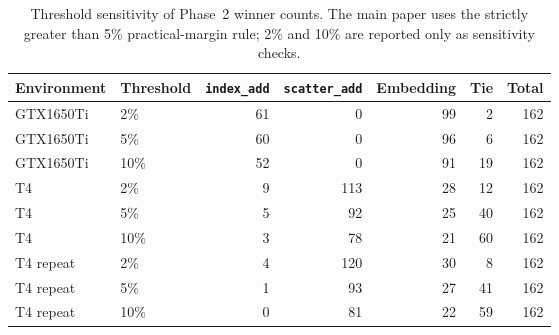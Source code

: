 \begin{table}[t]
\centering\fontsize{9}{11}\selectfont
\caption{Threshold sensitivity of Phase~2 winner counts. The main paper uses the strictly greater than 5\% practical-margin rule; 2\% and 10\% are reported only as sensitivity checks.}
\label{tab:threshold-sensitivity-phase2}
\setlength{\tabcolsep}{3pt}
\renewcommand{\arraystretch}{1.12}
\begin{tabular*}{\textwidth}{@{\extracolsep{\fill}}llrrrrr@{}}
\toprule
Environment & Threshold & \texttt{index\_add} & \texttt{scatter\_add} & Embedding & Tie & Total \\
\midrule
GTX1650Ti & 2\% & 61 & 0 & 99 & 2 & 162 \\
GTX1650Ti & 5\% & 60 & 0 & 96 & 6 & 162 \\
GTX1650Ti & 10\% & 52 & 0 & 91 & 19 & 162 \\
T4 & 2\% & 9 & 113 & 28 & 12 & 162 \\
T4 & 5\% & 5 & 92 & 25 & 40 & 162 \\
T4 & 10\% & 3 & 78 & 21 & 60 & 162 \\
T4 repeat & 2\% & 4 & 120 & 30 & 8 & 162 \\
T4 repeat & 5\% & 1 & 93 & 27 & 41 & 162 \\
T4 repeat & 10\% & 0 & 81 & 22 & 59 & 162 \\
\bottomrule
\end{tabular*}
\end{table}
